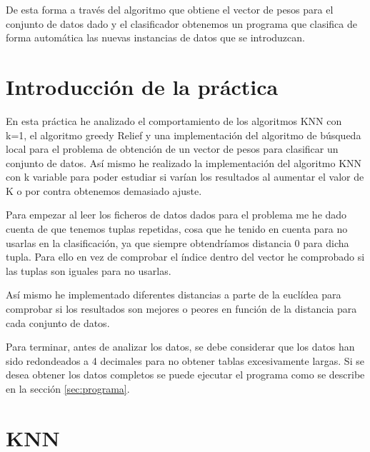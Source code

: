 \documentclass[12pt,a4paper]{article}
\begin{document}
	De esta forma a través del algoritmo que obtiene el vector de pesos para el conjunto de datos dado y el clasificador obtenemos un programa que clasifica de forma automática las nuevas instancias de datos que se introduzcan.
	
	\newpage

	\section{Introducción de la práctica}
	\label{sec:introPractica}
	
	En esta práctica he analizado el comportamiento de los algoritmos KNN con k=1, el algoritmo greedy Relief y una implementación del algoritmo de búsqueda local para el problema de obtención de un vector de pesos para clasificar un conjunto de datos. Así mismo he realizado la implementación del algoritmo KNN con k variable para poder estudiar si varían los resultados al aumentar el valor de K o por contra obtenemos demasiado ajuste.
	
	Para empezar al leer los ficheros de datos dados para el problema me he dado cuenta de que tenemos tuplas repetidas, cosa que he tenido en cuenta para no usarlas en la clasificación, ya que siempre obtendríamos distancia 0 para dicha tupla. Para ello en vez de comprobar el índice dentro del vector he comprobado si las tuplas son iguales para no usarlas.
	
	Así mismo he implementado diferentes distancias a parte de la euclídea para comprobar si los resultados son mejores o peores en función de la distancia para cada conjunto de datos.
	
	Para terminar, antes de analizar los datos, se debe considerar que los datos han sido redondeados a 4 decimales para no obtener tablas excesivamente largas. Si se desea obtener los datos completos se puede ejecutar el programa como se describe en la sección \hyperref[sec:programa]{\ref{sec:programa}}.

	\section{KNN}
	\label{sec:knn}
\end{document}
